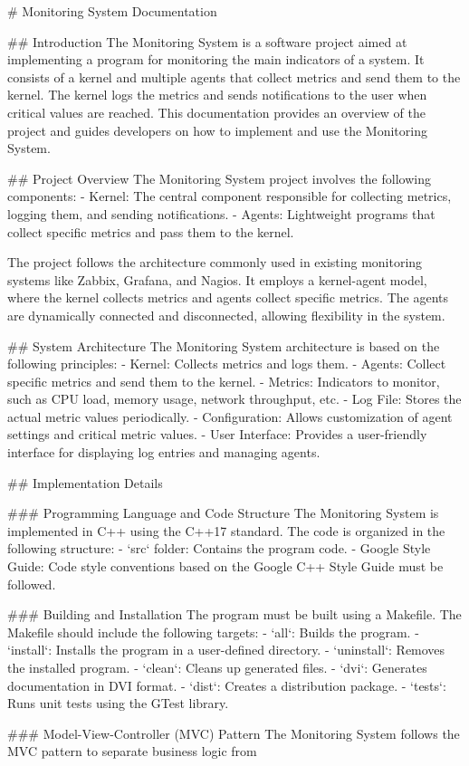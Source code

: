 # Monitoring System Documentation

## Introduction
The Monitoring System is a software project aimed at implementing a program for monitoring the main indicators of a system. It consists of a kernel and multiple agents that collect metrics and send them to the kernel. The kernel logs the metrics and sends notifications to the user when critical values are reached. This documentation provides an overview of the project and guides developers on how to implement and use the Monitoring System.

## Project Overview
The Monitoring System project involves the following components:
- Kernel: The central component responsible for collecting metrics, logging them, and sending notifications.
- Agents: Lightweight programs that collect specific metrics and pass them to the kernel.

The project follows the architecture commonly used in existing monitoring systems like Zabbix, Grafana, and Nagios. It employs a kernel-agent model, where the kernel collects metrics and agents collect specific metrics. The agents are dynamically connected and disconnected, allowing flexibility in the system.

## System Architecture
The Monitoring System architecture is based on the following principles:
- Kernel: Collects metrics and logs them.
- Agents: Collect specific metrics and send them to the kernel.
- Metrics: Indicators to monitor, such as CPU load, memory usage, network throughput, etc.
- Log File: Stores the actual metric values periodically.
- Configuration: Allows customization of agent settings and critical metric values.
- User Interface: Provides a user-friendly interface for displaying log entries and managing agents.

## Implementation Details

### Programming Language and Code Structure
The Monitoring System is implemented in C++ using the C++17 standard. The code is organized in the following structure:
- `src` folder: Contains the program code.
- Google Style Guide: Code style conventions based on the Google C++ Style Guide must be followed.

### Building and Installation
The program must be built using a Makefile. The Makefile should include the following targets:
- `all`: Builds the program.
- `install`: Installs the program in a user-defined directory.
- `uninstall`: Removes the installed program.
- `clean`: Cleans up generated files.
- `dvi`: Generates documentation in DVI format.
- `dist`: Creates a distribution package.
- `tests`: Runs unit tests using the GTest library.

### Model-View-Controller (MVC) Pattern
The Monitoring System follows the MVC pattern to separate business logic from